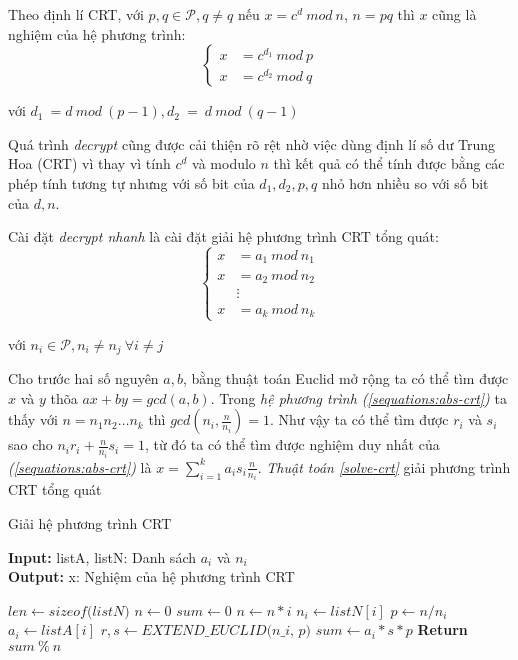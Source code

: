 Theo định lí CRT, với $p, q \in \mathcal{P}, q \neq q$ nếu $x = c^d\ mod \ n$, $n = pq$ thì $x$ cũng là nghiệm của hệ phương trình:
\begin{equation}
\begin{cases}
x &= c^{d_1}\ mod\ p \\
x &= c^{d_2}\ mod\ q
\end{cases}
\end{equation}
\begin{center}
với $d_1\ = d\ mod\ (p - 1), d_2\ =\ d\ mod\ (q - 1) $
\end{center}

Quá trình \textit{decrypt} cũng được cải thiện rõ rệt nhờ việc dùng định lí số dư Trung Hoa (CRT) vì thay vì tính $c^d$ và modulo $n$ thì kết quả có thể tính 
được bằng các phép tính tương tự nhưng với số bit của $d_1, d_2, p, q$ nhỏ hơn nhiều so với số bit của $d, n$.

Cài đặt \textit{decrypt nhanh} là cài đặt giải hệ phương trình CRT tổng quát:
\begin{equation}\label{sequations:abs-crt}
\begin{cases}
x &= a_1\ mod\ n_1 \\
x &= a_2\ mod\ n_2 \\
& \vdots \\
x &= a_k\ mod\ n_k
\end{cases}
\end{equation}
\begin{center}
với $n_i \in \mathcal{P}, n_i \neq n_j\ \forall i \neq j$
\end{center}

Cho trước hai số nguyên $a,b$, bằng thuật toán Euclid mở rộng ta có thể tìm được $x$ và $y$ thõa $ax + by = gcd(a,b)$. Trong \textit{hệ phương trình (\ref{sequations:abs-crt})} 
ta thấy với $n=n_1n_2\hdots n_k$ thì $gcd(n_i,\frac{n}{n_i}) = 1$. Như vậy ta có thể tìm được $r_i$ và $s_i$ sao cho $n_i r_i + \frac{n}{n_i} s_i = 1$, 
từ đó ta có thể tìm được nghiệm duy nhất của \textit{(\ref{sequations:abs-crt})} là $x = \sum_{i=1}^{k}a_is_i\frac{n}{n_i}$. \textit{Thuật toán \ref{solve-crt}} giải phương trình CRT tổng quát

\begin{algorithm}
\caption{Giải hệ phương trình CRT}\label{alg:solve-crt}
\hspace*{\algorithmicindent} \textbf{Input:} listA, listN: Danh sách $a_i$ và $n_i$\\
\hspace*{\algorithmicindent} \textbf{Output:} x: Nghiệm của hệ phương trình CRT
\begin{algorithmic}[1]
\State $len \gets \textit{sizeof(listN)}$
\State $n \gets 0$
\State $sum \gets 0$
\State $n \gets n*i$
\EndFor
{}
\State $n_i \gets listN[i]$
\State $p \gets n/n_i$
\State $a_i \gets listA[i]$
\State $r,s \gets \textit{EXTEND\_EUCLID(n_i, p)}$
\State $sum \gets a_i*s*p$
\EndFor
\State \textbf{Return } $sum\ \%\ n$
\EndProcedure
\end{algorithmic}
\end{algorithm}